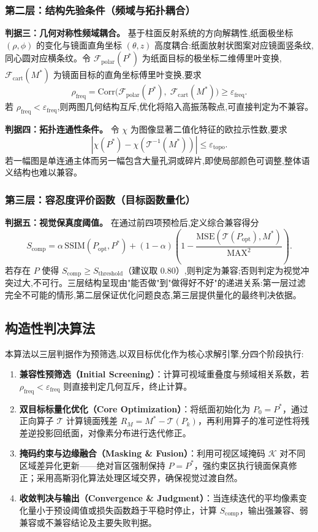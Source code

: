 \documentclass[12pt, a4paper]{ctexart}
\begin{document}
\subsubsection{第二层：结构先验条件（频域与拓扑耦合）}

\textbf{判据三：几何对称性频域耦合。}
基于柱面反射系统的方向解耦性,纸面极坐标 $(\rho,\phi)$ 的变化与镜面直角坐标 $(\theta,z)$ 高度耦合:纸面放射状图案对应镜面竖条纹,同心圆对应横条纹。令 $\mathcal{F}_{\mathrm{polar}}(P^*)$ 为纸面目标的极坐标二维傅里叶变换,$\mathcal{F}_{\mathrm{cart}}(M^*)$ 为镜面目标的直角坐标傅里叶变换,要求
\[
\rho_{\mathrm{freq}} = \mathrm{Corr}\bigl(\mathcal{F}_{\mathrm{polar}}(P^*),\;\mathcal{F}_{\mathrm{cart}}(M^*)\bigr) \ge \varepsilon_{\mathrm{freq}}.
\]
若 $\rho_{\mathrm{freq}} < \varepsilon_{\mathrm{freq}}$,则两图几何结构互斥,优化将陷入高振荡鞍点,可直接判定为不兼容。

\textbf{判据四：拓扑连通性条件。}
令 $\chi$ 为图像显著二值化特征的欧拉示性数,要求
\[
|\chi(P^*) - \chi(\mathcal{T}^{-1}(M^*))| \le \varepsilon_{\mathrm{topo}}.
\]
若一幅图是单连通主体而另一幅包含大量孔洞或碎片,即使局部颜色可调整,整体语义结构也难以兼容。

\subsubsection{第三层：容忍度评价函数（目标函数量化）}

\textbf{判据五：视觉保真度阈值。}
在通过前四项预检后,定义综合兼容得分
\[
S_{\mathrm{comp}} = \alpha\,\mathrm{SSIM}(P_{\mathrm{opt}},P^*)
+ (1-\alpha)\left(1 - \frac{\mathrm{MSE}(\mathcal{T}(P_{\mathrm{opt}}),M^*)}{\mathrm{MAX}^2}\right).
\]
若存在 $P$ 使得 $S_{\mathrm{comp}} \ge S_{\mathrm{threshold}}$（建议取 $0.80$）,则判定为兼容;否则判定为视觉冲突过大,不可行。三层结构呈现由"能否做"到"做得好不好"的递进关系:第一层过滤完全不可能的情形,第二层保证优化问题良态,第三层提供量化的最终判决依据。

\subsection{构造性判决算法}

本算法以三层判据作为预筛选,以双目标优化作为核心求解引擎,分四个阶段执行:
\begin{enumerate}
\item \textbf{兼容性预筛选（Initial Screening）}：计算可视域重叠度与频域相关系数，若 $\rho_{\mathrm{freq}} < \varepsilon_{\mathrm{freq}}$ 则直接判定几何互斥，终止计算。
\item \textbf{双目标标量化优化（Core Optimization）}：将纸面初始化为 $P_0 = P^*$，通过正向算子 $\mathcal{T}$ 计算镜面残差 $R_M = M^* - \mathcal{T}(P_k)$，再利用算子的准可逆性将残差逆投影回纸面，对像素分布进行迭代修正。
\item \textbf{掩码约束与边缘融合（Masking \& Fusion）}：利用可视区域掩码 $\mathcal{K}$ 对不同区域差异化更新——绝对盲区强制保持 $P = P^*$，强约束区执行镜面保真修正；采用高斯羽化算法处理区域交界，确保视觉过渡自然。
\item \textbf{收敛判决与输出（Convergence \& Judgment）}：当连续迭代的平均像素变化量小于预设阈值或损失函数趋于平稳时停止，计算 $S_{\mathrm{comp}}$，输出强兼容、弱兼容或不兼容结论及主要失败判据。
\end{enumerate}
\end{document}
